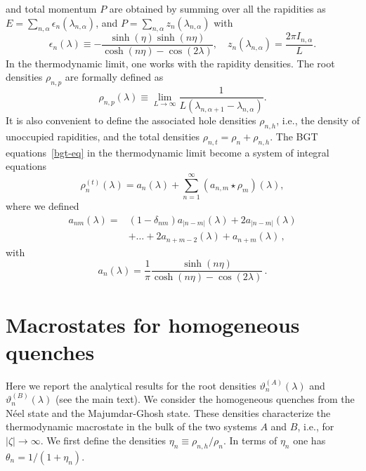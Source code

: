 \documentclass[twocolumn,superscriptaddress,prb,10pt]{revtex4-1}
\begin{document}
and total momentum $P$ are obtained by summing over all the rapidities 
as $E=\sum_{n,\alpha}\epsilon_n(\lambda_{n,\alpha})$, and $P=\sum_{n,\alpha}z_n(
\lambda_{n,\alpha})$ with 
%
\begin{equation}
\label{eps}
\epsilon_n(\lambda)\equiv-\frac{\sinh(\eta)\sinh(n\eta)}{\cosh(n\eta)-\cos(2\lambda)}, 
\quad z_n(\lambda_{n,\alpha})=\frac{2\pi I_{n,\alpha}}{L}. 
\end{equation}
%
In the thermodynamic limit, one works with the rapidity densities. The root 
densities $\rho_{n,p}$  are formally defined as 
%
\begin{equation}
\rho_{n,p}(\lambda)\equiv\lim_{L\to\infty}  \frac1{L(\lambda_{n,\alpha+1}-\lambda_{n,\alpha})}. 
\end{equation}
%
It is also convenient to define the associated hole densities $\rho_{n,h}$, i.e., 
the density of unoccupied rapidities, and the total densities $\rho_{n,t}=
\rho_{n}+\rho_{n,h}$. The BGT equations~\eqref{bgt-eq} in the thermodynamic limit 
become a system of integral equations 
%
\begin{equation}
\label{tba1}
\rho^{(t)}_{n}(\lambda)=a_n(\lambda)+\sum_{n=1}^\infty (a_{n,m}\star\rho_{m})
(\lambda), 
\end{equation}
%
where we defined 
%
\begin{align}
\label{anm}
a_{nm}(\lambda)=&(1-\delta_{nm})a_{|n-m|}(\lambda)+2a_{|n-m|}(\lambda)\nonumber\\
 &+\ldots +2a_{n+m-2}(\lambda)+a_{n+m}(\lambda)\,,
\end{align}
%
with 
%
\begin{equation}
 a_n(\lambda)=\frac{1}{\pi} \frac{\sinh\left( n\eta\right)}{\cosh (n
 \eta) - \cos( 2 \lambda)}\,.
\end{equation}
%

\section{Macrostates for homogeneous quenches}
\label{steady}

Here we report the analytical results for the root densities $\vartheta^{
\scriptscriptstyle(A)}_n(\lambda)$ and $\vartheta^{\scriptscriptstyle(B)}_n(\lambda)$ (see 
the main text). We consider the homogeneous quenches from the N\'eel 
state and the Majumdar-Ghosh state. These densities characterize the thermodynamic 
macrostate in the bulk of the two systems $A$ and $B$, 
i.e., for $|\zeta|\to\infty$. We first define the densities $\eta_n\equiv
\rho_{n,h}/\rho_{n}$. In terms of $\eta_n$ one has $\theta_n=1/(1+\eta_n)$. 
\end{document}
